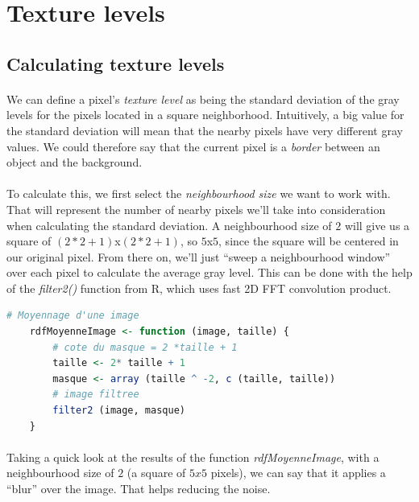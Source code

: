 \clearpage

\section{Texture levels}
\subsection{Calculating texture levels}
\paragraph{}
We can define a pixel's \emph{texture level} as being the standard deviation of the gray levels for the pixels located in a square neighborhood.
Intuitively, a big value for the standard deviation will mean that the nearby pixels have very different gray values.
We could therefore say that the current pixel is a \emph{border} between an object and the background.
\paragraph{}
To calculate this, we first select the \emph{neighbourhood size} we want to work with.
That will represent the number of nearby pixels we'll take into consideration when calculating the standard deviation.
A neighbourhood size of $2$ will give us a square of $(2*2+1)$x$(2*2+1)$, so $5$x$5$, since the square will be centered in our original pixel.
From there on, we'll just ``sweep a neighbourhood window'' over each pixel to calculate the average gray level.
This can be done with the help of the \emph{filter2()} function from R, which uses fast 2D FFT convolution product. \cite{r_documentation}

\begin{lstlisting}[language=R, caption=Calculating a pixel's average value]
    # Moyennage d'une image
    rdfMoyenneImage <- function (image, taille) {
        # cote du masque = 2 *taille + 1
        taille <- 2* taille + 1
        masque <- array (taille ^ -2, c (taille, taille))
        # image filtree
        filter2 (image, masque)
    }
\end{lstlisting}

\paragraph{}
Taking a quick look at the results of the function \emph{rdfMoyenneImage}, with a neighbourhood size of $2$ (a square of $5x5$ pixels), we can say that it applies a ``blur'' over the image.
That helps reducing the noise.


